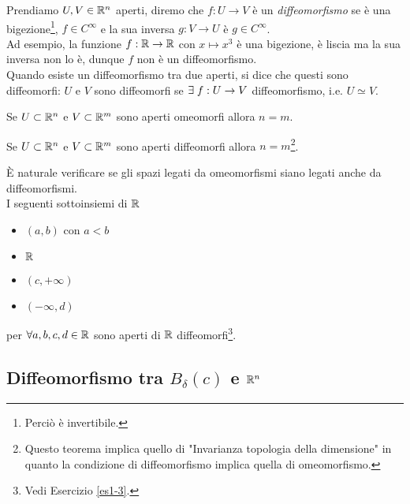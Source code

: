 Prendiamo $ U, V \in \mathbb{R}^{n} $ aperti, diremo che $ f : U \to V $ è un \textit{diffeomorfismo} se è una bigezione\footnote{%
	Perciò è invertibile.%
}, $ f \in C^{\infty} $ e la sua inversa $ g : V \to U $ è  $ g \in C^{\infty} $.\\
Ad esempio, la funzione $ f : \mathbb{R} \to \mathbb{R} $ con $ x \mapsto x^{3} $ è una bigezione, è liscia ma la sua inversa non lo è, dunque $ f $ non è un diffeomorfismo.\\
Quando esiste un diffeomorfismo tra due aperti, si dice che questi sono diffeomorfi: $ U $ e $ V $ sono diffeomorfi se $ \exists \; f : U \to V $ diffeomorfismo, i.e. $ U \simeq V $.\\

\begin{theorem}
	Se $ U \subset \mathbb{R}^{n} $ e $ V \subset \mathbb{R}^{m} $ sono aperti omeomorfi allora $ n = m $.
\end{theorem}

\begin{theorem}
	Se $ U \subset \mathbb{R}^{n} $ e $ V \subset \mathbb{R}^{m} $ sono aperti diffeomorfi allora $ n = m $\footnote{%
		Questo teorema implica quello di "Invarianza topologia della dimensione" in quanto la condizione di diffeomorfismo implica quella di omeomorfismo.}.
\end{theorem}

\`{E} naturale verificare se gli spazi legati da omeomorfismi siano legati anche da diffeomorfismi.\\
I seguenti sottoinsiemi di $ \mathbb{R} $

\begin{itemize}
	\item $ (a,b) $ con $ a < b $
	
	\item $ \mathbb{R} $
	
	\item $ (c, + \infty) $
	
	\item $ (- \infty, d) $
\end{itemize}

per  $ \forall a,b,c,d \in \mathbb{R} $ sono aperti di $ \mathbb{R} $ diffeomorfi\footnote{%
	Vedi Esercizio \ref{es1-3}.%
}.

\subsection{Diffeomorfismo tra $ B_{\delta} (c) $ e $ \mathbb{R}^{n} $}


